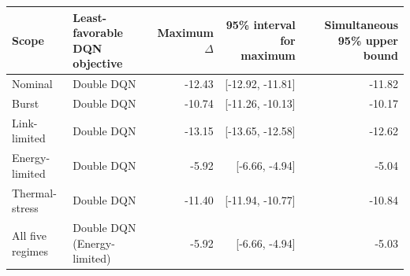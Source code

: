 \begin{tabular}{llrrr}
\toprule
Scope & Least-favorable DQN objective & Maximum $\Delta$ & 95\% interval for maximum & Simultaneous 95\% upper bound \\
\midrule
Nominal & Double DQN & -12.43 & [-12.92, -11.81] & -11.82 \\
Burst & Double DQN & -10.74 & [-11.26, -10.13] & -10.17 \\
Link-limited & Double DQN & -13.15 & [-13.65, -12.58] & -12.62 \\
Energy-limited & Double DQN & -5.92 & [-6.66, -4.94] & -5.04 \\
Thermal-stress & Double DQN & -11.40 & [-11.94, -10.77] & -10.84 \\
All five regimes & Double DQN (Energy-limited) & -5.92 & [-6.66, -4.94] & -5.03 \\
\bottomrule
\end{tabular}